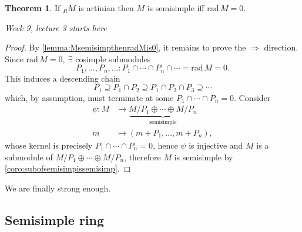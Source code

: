 \documentclass[a4paper]{article}
\newcommand{\rad}{\text{rad}\,}
\theoremstyle{definition}
\newtheorem{thm}[defn]{Theorem}
\begin{document}
\begin{thm}
If $_RM$ is artinian then $M$ is semisimple iff $\rad M=0$.
\end{thm}

\begin{flushright}
\textit{Week 9, lecture 3 starts here}
\end{flushright}

\begin{proof}
By \ref{lemma:MsemisimpthenradMis0}, it remains to prove the $\Rightarrow$ direction. Since $\rad M=0,\ \exists$ cosimple submodules
\[
P_1,\ldots,P_n,\ldots: P_1\cap\cdots\cap P_n\cap\cdots=\rad M=0.
\]
This induces a descending chain
\[
P_1\supseteq P_1\cap P_2\supseteq P_1\cap P_2\cap P_3\supseteq\cdots
\]
which, by assumption, must terminate at some $P_1\cap\cdots\cap P_n=0$. Consider
\[
\begin{aligned}
\psi:M&\rightarrow \underbrace{M/P_1\oplus\cdots\oplus M/P_n}_{\text{semisimple}}\\
m&\mapsto (m+P_1,\ldots,m+P_n),
\end{aligned}
\]
whose kernel is precisely $P_1\cap\cdots\cap P_n=0$, hence $\psi$ is injective and $M$ is a submodule of $M/P_1\oplus\cdots\oplus M/P_n$, therefore $M$ is semisimple by \ref{coro:subofsemisimpissemisimp}.
\end{proof}

We are finally strong enough.
\subsection{Semisimple ring}
\end{document}
